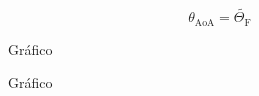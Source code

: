 \begin{equation} %
    \theta_\text{AoA} = \widetilde{\Theta_\text{F}}
\end{equation}

\begin{figure}[H]
    \centering
    
    \caption{Gráfico}
\end{figure}

\begin{figure}[H]
    \centering
    
    \caption{Gráfico}
\end{figure}
